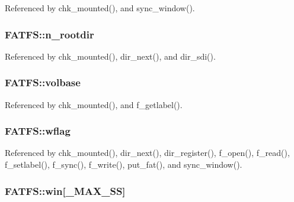 Referenced by chk\-\_\-mounted(), and sync\-\_\-window().

\hypertarget{structFATFS_a189a00aa038044ffad0fc7f7dcf2aae1}{
\subsubsection[{n\-\_\-rootdir}]{ F\-A\-T\-F\-S\-::n\-\_\-rootdir}}\label{structFATFS_a189a00aa038044ffad0fc7f7dcf2aae1}


Referenced by chk\-\_\-mounted(), dir\-\_\-next(), and dir\-\_\-sdi().

\hypertarget{structFATFS_a8f0ca578755749d204f59dc83f1a7649}{
\subsubsection[{volbase}]{ F\-A\-T\-F\-S\-::volbase}}\label{structFATFS_a8f0ca578755749d204f59dc83f1a7649}


Referenced by chk\-\_\-mounted(), and f\-\_\-getlabel().

\hypertarget{structFATFS_a647e43c9ccae94b7274793d1909897de}{
\subsubsection[{wflag}]{ F\-A\-T\-F\-S\-::wflag}}\label{structFATFS_a647e43c9ccae94b7274793d1909897de}


Referenced by chk\-\_\-mounted(), dir\-\_\-next(), dir\-\_\-register(), f\-\_\-open(), f\-\_\-read(), f\-\_\-setlabel(), f\-\_\-sync(), f\-\_\-write(), put\-\_\-fat(), and sync\-\_\-window().

\hypertarget{structFATFS_a7cc35a593465e727ab87723c14610644}{
\subsubsection[{win}]{ F\-A\-T\-F\-S\-::win\mbox{[}{\bf \-\_\-\-M\-A\-X\-\_\-\-S\-S}\mbox{]}}}\label{structFATFS_a7cc35a593465e727ab87723c14610644}


